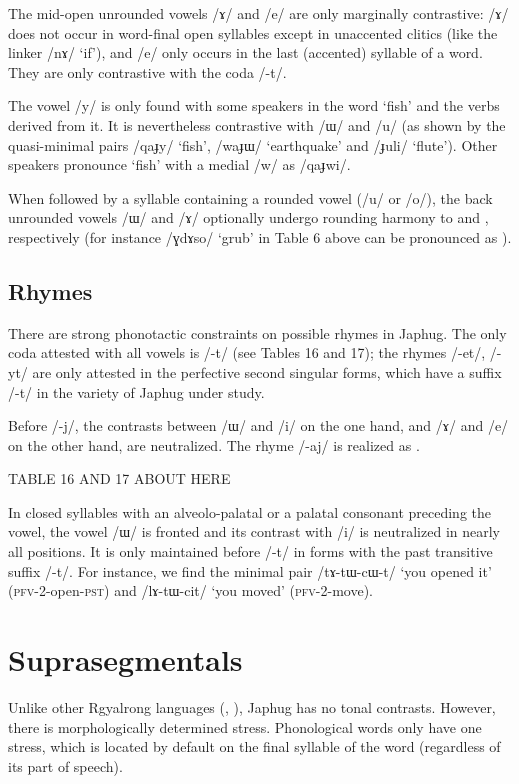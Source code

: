 \documentclass[12pt]{article}
\newcommand{\ipa}[1]{\mbox{\phon/#1/}}
\newcommand{\phonet}[1]{\mbox{\phon[#1]}}
\begin{document}
The mid-open unrounded vowels \ipa{ɤ} and \ipa{e} are only marginally contrastive: \ipa{ɤ} does not occur in word-final open syllables except in unaccented clitics (like the linker \ipa{nɤ} `if'), and \ipa{e} only occurs in the last (accented) syllable of a word. They are only contrastive with the coda \ipa{-t}.
     
The vowel \ipa{y} is only found with some speakers in the word `fish' and the verbs derived from it. It is nevertheless contrastive with \ipa{ɯ} and \ipa{u} (as shown by the quasi-minimal pairs \ipa{qaɟy} `fish', \ipa{waɟɯ} `earthquake' and \ipa{ɟuli} `flute'). Other speakers pronounce `fish' with a medial \ipa{w} as \ipa{qaɟwi}. 

When followed by a syllable containing a rounded vowel (\ipa{u} or \ipa{o}), the back unrounded vowels \ipa{ɯ} and \ipa{ɤ} optionally undergo rounding harmony to \phonet{u} and \phonet{o}, respectively (for instance \ipa{ɣdɤso} `grub' in Table 6 above can be pronounced as  \phonet{ɣdoso}).
     
\subsection*{Rhymes}     \label{sec:rhymes}
     There are strong phonotactic constraints on possible rhymes in Japhug. The only coda attested with all  vowels is \ipa{-t} (see Tables 16 and 17); the rhymes \ipa{-et}, \ipa{-yt} are only attested in the perfective second singular forms, which have a suffix \ipa{-t} in the variety of Japhug under study.
 
Before \ipa{-j}, the contrasts between \ipa{ɯ} and \ipa{i} on the one hand, and \ipa{ɤ} and \ipa{e} on the other hand, are neutralized. The rhyme \ipa{-aj} is realized as \phonet{ɛj}.

TABLE 16 AND 17 ABOUT HERE

In closed syllables with an alveolo-palatal or a palatal consonant preceding the vowel, the vowel \ipa{ɯ} is fronted and its contrast with \ipa{i} is neutralized in nearly all positions. It is only maintained before \ipa{-t} in forms with the past transitive suffix  \ipa{-t}. For instance, we find the minimal pair \ipa{tɤ-tɯ-cɯ-t} `you opened it' (\textsc{pfv}-2-open-\textsc{pst}) and \ipa{lɤ-tɯ-cit} `you moved' (\textsc{pfv}-2-move).
    
     \section*{Suprasegmentals}
Unlike other Rgyalrong languages (\citealt{jackson05yingao}, \citealt{linyj12tone}), Japhug has no tonal contrasts. However, there is morphologically determined stress. Phonological words only have one stress, which is located by default on the final syllable of the word (regardless of its part of speech).
\end{document}
